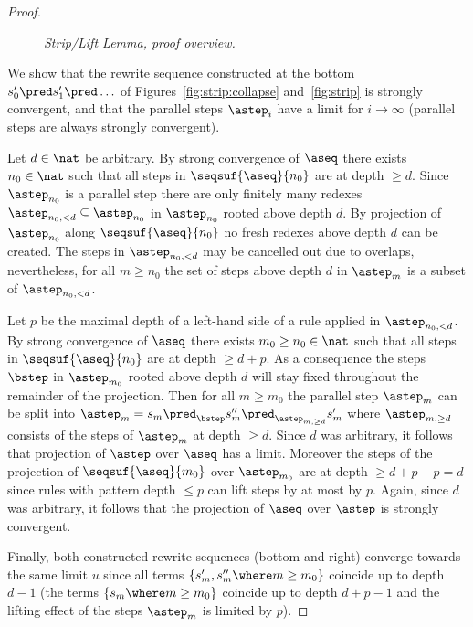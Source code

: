 \begin{proof}
\begin{figure}[hpt!]
\begin{center}
  \end{center}\vspace{-3ex}
  \caption{\textit{Strip/Lift Lemma, proof overview.}}
  \label{fig:strip:proof}
  \end{figure}

  We show that the rewrite sequence constructed at the bottom $s_0' \pred s_1' \pred \ldots$
  of Figures~\ref{fig:strip:collapse} and~\ref{fig:strip} is strongly convergent,
  and that the parallel steps $\astep_i$ have a limit for $i \to \infty$
  (parallel steps are always strongly convergent).

  Let $d \in \nat$ be arbitrary.
  By strong convergence of $\aseq$ there exists $n_0 \in \nat$ such that
  all steps in $\seqsuf{\aseq}{n_0}$ are at depth $\ge d$.
  Since $\astep_{n_0}$ is a parallel step there are only finitely many
  redexes $\astep_{n_0,<d} \subseteq \astep_{n_0}$ in $\astep_{n_0}$ rooted above depth $d$.
  By projection of $\astep_{n_0}$ along $\seqsuf{\aseq}{n_0}$
  no fresh redexes above depth $d$ can be created.
  The steps in $\astep_{n_0,<d}$ may be cancelled out due to overlaps,
  nevertheless, for all $m \ge n_0$ the set of steps above depth $d$ in $\astep_m$
  is a subset of $\astep_{n_0,<d}$.

  Let $p$ be the maximal depth of a left-hand side of a rule applied in $\astep_{n_0,<d}$.
  By strong convergence of $\aseq$ there exists $m_0 \ge n_0 \in \nat$ such that
  all steps in $\seqsuf{\aseq}{n_0}$ are at depth $\ge d+p$.
  As a consequence the steps $\bstep$ in $\astep_{m_0}$ rooted above depth $d$
  will stay fixed throughout the remainder of the projection.
  Then for all $m \ge m_0$ the parallel step $\astep_m$
  can be split into $\astep_m = s_m \pred_\bstep s_m'' \pred_{\astep_{m,\ge d}} s_m'$
  where $\astep_{m,\ge d}$ consists of the steps of $\astep_m$ at depth $\ge d$.
  Since $d$ was arbitrary, it follows that projection of $\astep$ over $\aseq$ has a limit.
  Moreover the steps of the projection of $\seqsuf{\aseq}{m_0}$ over $\astep_{m_0}$
  are at depth $\ge d + p - p = d$ since rules with pattern depth $\le p$ can lift steps by at most by $p$.
  Again, since $d$ was arbitrary, it follows that the projection of $\aseq$ over $\astep$ is strongly convergent.

  Finally, both constructed rewrite sequences (bottom and right) converge towards the same limit $u$
  since all terms $\{s_m', s_m'' \where m \ge m_0\}$ coincide up to depth $d-1$
  (the terms $\{s_m \where m \ge m_0\}$ coincide up to depth $d + p -1$ and the lifting effect of the steps $\astep_m$ is limited by $p$).
\end{proof}

